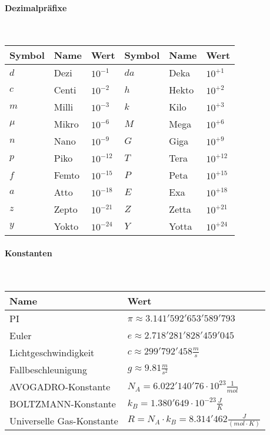 \paragraph{Dezimalpräfixe}\mbox{}\\
\begin{tabularx}{\columnwidth}{@{}lXl|XlX@{}}
	\hline
	Symbol & Name  & Wert         & Symbol & Name  & Wert         \\ \hline
	$d$    & Dezi  & $ 10^{-1} 	$  & $da$   & Deka  & $ 10^{+1}  $ \\ \hline
	$c$    & Centi & $ 10^{-2} 	$  & $h$    & Hekto & $ 10^{+2}  $ \\ \hline
	$m$    & Milli & $ 10^{-3} 	$  & $k$    & Kilo  & $ 10^{+3}  $ \\ \hline
	$\mu$  & Mikro & $ 10^{-6} 	$  & $M$    & Mega  & $ 10^{+6}  $ \\ \hline
	$n$    & Nano  & $ 10^{-9} 	$  & $G$    & Giga  & $ 10^{+9}  $ \\ \hline
	$p$    & Piko  & $ 10^{-12} $ & $T$    & Tera  & $ 10^{+12} $ \\ \hline
	$f$    & Femto & $ 10^{-15} $ & $P$    & Peta  & $ 10^{+15} $ \\ \hline
	$a$    & Atto  & $ 10^{-18} $ & $E$    & Exa   & $ 10^{+18} $ \\ \hline
	$z$    & Zepto & $ 10^{-21} $ & $Z$    & Zetta & $ 10^{+21} $ \\ \hline
	$y$    & Yokto & $ 10^{-24} $ & $Y$    & Yotta & $ 10^{+24} $ \\ \hline
\end{tabularx}
\vspace{1mm}

\paragraph{Konstanten}\mbox{}\\
\begin{tabularx}{\columnwidth}{@{}lX@{}}
	\hline
	Name                      & Wert                                                               \\ \hline
	PI                        & $\pi \approx 3.141'592'653'589'793$                                \\
	Euler                     & $e \approx 2.718'281'828'459'045$                                  \\
	Lichtgeschwindigkeit      & $c \approx 299'792'458 \frac{m}{s}$                                \\
	Fallbeschleunigung        & $g \approx 9.81\frac{m}{s^2} $                                     \\
	AVOGADRO-Konstante        & $N_A = 6.022'140'76\cdot10^{23}\frac{1}{mol}$                      \\
	BOLTZMANN-Konstante       & $k_B = 1.380'649\cdot10^{-23}\frac{J}{K}$                          \\
	Universelle Gas-Konstante & $R = N_A\cdot k_B = 8.314'462 \frac{J}{\left( mol\cdot K \right)}$ \\
\end{tabularx}
\vspace{1mm}

